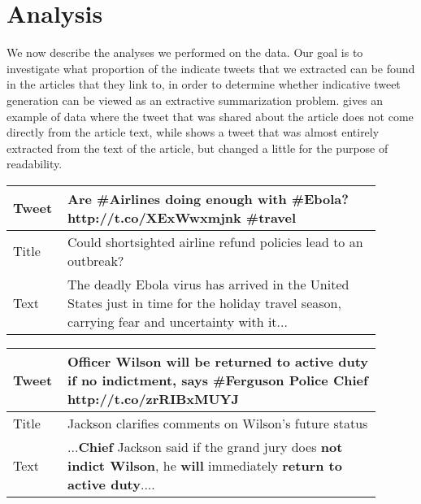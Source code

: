 \section{Analysis}
\label{sec:analysis}

We now describe the analyses we performed on the data. Our goal is to investigate what proportion of the indicate tweets that we extracted can be found in the articles that they link to, in order to determine whether indicative tweet generation can be viewed as an extractive summarization problem.  gives an example of data where the tweet that was shared about the article does not come directly from the article text, while  shows a tweet that was almost entirely extracted from the text of the article, but changed a little for the purpose of readability.

\begin{table}[htbp]
\centering
\begin{tabular}{|p{0.1\linewidth}|p{0.8\linewidth}|}
\hline
Tweet &  Are \#Airlines doing enough with \#Ebola? http://t.co/XExWwxmjnk \#travel \\ \hline
Title &  Could shortsighted airline refund policies lead to an outbreak? \\  \hline
Text  &  The deadly Ebola virus has arrived in the United States just in time for the holiday travel season, carrying fear and uncertainty with it... \\ \hline
\end{tabular}
\label{tab:noextract}
\end{table}

\begin{table}[htbp]
\centering
\begin{tabular}{|p{0.1\linewidth}|p{0.8\linewidth}|}
\hline
Tweet & Officer \textbf{Wilson will be returned to active duty if no indictment}, says \#Ferguson Police \textbf{Chief} http://t.co/zrRIBxMUYJ  \\ \hline
Title & Jackson clarifies comments on Wilson's future status \\ \hline
Text  & ...\textbf{Chief} Jackson said if the grand jury does \textbf{not indict Wilson}, he \textbf{will} immediately \textbf{return to active duty}.... \\ \hline
\end{tabular}
\label{tab:extract}
\end{table}

